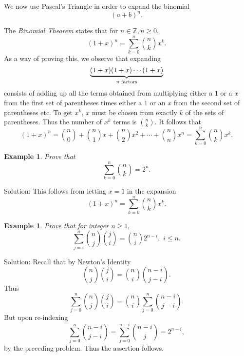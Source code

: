 \documentclass[11pt, openany]{book}
\theoremstyle{change} \theoremheaderfont{\blue\sffamily\bfseries}
\newtheorem{exa}[thm]{Example}
\theoremstyle{nonumberplain} \theoremheaderfont{\sffamily\bfseries}
\newcommand{\BBZ}{\mathbb{Z}}
\def\binom#1#2{{#1\choose#2}}
\newcommand{\í}{\'{\i}}
\begin{document}
We now use Pascal's Triangle in order to expand the binomial $$(a
+ b)^n.$$



The {\em Binomial Theorem} states that for $n \in\BBZ, n \geq 0,$
$$(1 + x)^n = \sum _{k = 0} ^n \binom{n}{k}x^k .$$As a way of proving this, we observe that expanding
$$\underbrace{(1 + x)(1 + x) \cdots (1 + x)}_{\scriptsize{{\it n} \ {\rm factors}}}$$
consists of adding up all the terms obtained from multiplying
either a $1$ or a $x$ from the first set of parentheses times
either a $1$ or an $x$ from the second set of parentheses etc.  To
get $x^k$, $x$ must be chosen from exactly $k$ of the sets of
parentheses.  Thus the number of $x^k$ terms is $\binom{n}{k}$. It
follows that
$$(1 + x)^n = \binom{n}{0} + \binom{n}{1}x + \binom{n}{2}x^2 + \cdots + \binom{n}{n}x^n =
\sum _{k = 0} ^n \binom{n}{k}x^k.$$
\begin{exa} Prove that $$ \sum _{k = 0} ^n \binom{n}{k} = 2^n .$$\end{exa}
Solution: This follows from letting $x = 1$ in the expansion
$$ (1 + x)^n = \sum _{k = 0} ^n \binom{n}{k}x^k .$$
\begin{exa} Prove that for integer $n \geq 1,$
$$ \sum _{j = i} ^n \binom{n}{j}\binom{j}{i} = \binom{n}{i}2^{n - i},
\,\, i \leq n.$$ \end{exa} Solution: Recall that by Newton's
Identity$$\binom{n}{j}\binom{j}{i} = \binom{n}{i}\binom{n - i}{j -
i}.$$Thus $$\sum _{j = 0} ^n \binom{n}{j}\binom{j}{i} =
\binom{n}{i}\sum _{j = 0} ^n \binom{n - i}{j - i}.$$But upon
re-indexing$$ \sum _{j = 0} ^n \binom{n - i}{j - i} = \sum _{j =
0} ^{n - i} \binom{n - i}{j} =  2^{n - i},$$by the preceding
problem. Thus the assertion follows.
\end{document}
